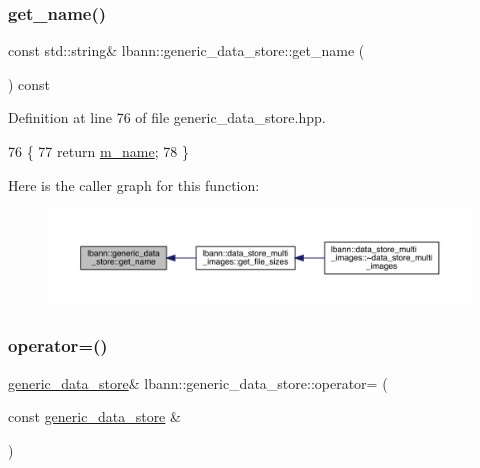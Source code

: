 \subsubsection{\texorpdfstring{get\+\_\+name()}{get\_name()}}
{\footnotesize\ttfamily const std\+::string\& lbann\+::generic\+\_\+data\+\_\+store\+::get\+\_\+name (\begin{DoxyParamCaption}{ }\end{DoxyParamCaption}) const\hspace{0.3cm}{\ttfamily [inline]}}



Definition at line 76 of file generic\+\_\+data\+\_\+store.\+hpp.


\begin{DoxyCode}
76                                      \{
77     \textcolor{keywordflow}{return} \hyperlink{classlbann_1_1generic__data__store_ad2c2e241eefc6ff972169d757f8d2499}{m\_name};
78   \}
\end{DoxyCode}
Here is the caller graph for this function\+:\nopagebreak
\begin{figure}[H]
\begin{center}
\leavevmode
\includegraphics[width=350pt]{classlbann_1_1generic__data__store_a53140adb8f7c2348986916a1abb85ffa_icgraph}
\end{center}
\end{figure}
\mbox{\label{classlbann_1_1generic__data__store_a680cf1fc618f6505a04255920ee7d7f2}} 
\subsubsection{\texorpdfstring{operator=()}{operator=()}}
{\footnotesize\ttfamily \hyperlink{classlbann_1_1generic__data__store}{generic\+\_\+data\+\_\+store}\& lbann\+::generic\+\_\+data\+\_\+store\+::operator= (\begin{DoxyParamCaption}\item[{const \hyperlink{classlbann_1_1generic__data__store}{generic\+\_\+data\+\_\+store} \&}]{ }\end{DoxyParamCaption})\hspace{0.3cm}{\ttfamily [default]}}



